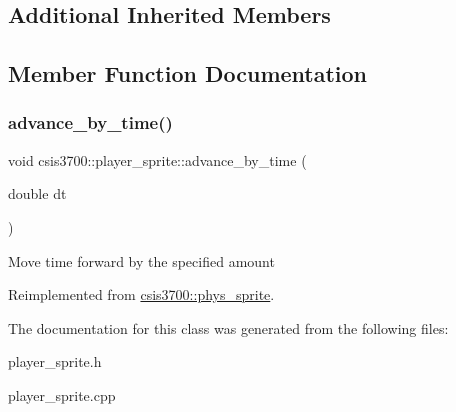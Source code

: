 \subsection*{Additional Inherited Members}


\subsection{Member Function Documentation}
\mbox{\label{classcsis3700_1_1player__sprite_ac2453e0b3934ac639d704c4ecca7493d}} 
\subsubsection{\texorpdfstring{advance\+\_\+by\+\_\+time()}{advance\_by\_time()}}
{\footnotesize\ttfamily void csis3700\+::player\+\_\+sprite\+::advance\+\_\+by\+\_\+time (\begin{DoxyParamCaption}\item[{double}]{dt }\end{DoxyParamCaption})\hspace{0.3cm}{\ttfamily [virtual]}}

Move time forward by the specified amount 

Reimplemented from \hyperlink{classcsis3700_1_1phys__sprite_a3bb24599b1bc2fd13846826308914db4}{csis3700\+::phys\+\_\+sprite}.



The documentation for this class was generated from the following files\+:\begin{DoxyCompactItemize}
\item 
player\+\_\+sprite.\+h\item 
player\+\_\+sprite.\+cpp\end{DoxyCompactItemize}
